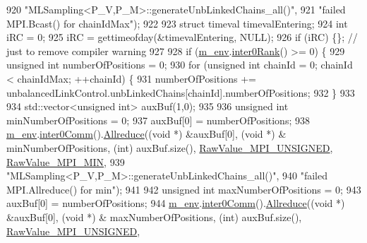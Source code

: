 \begin{DoxyCode}
920                         \textcolor{stringliteral}{"MLSampling<P\_V,P\_M>::generateUnbLinkedChains\_all()"},
921                         \textcolor{stringliteral}{"failed MPI.Bcast() for chainIdMax"});
922 
923   \textcolor{keyword}{struct }timeval timevalEntering;
924   \textcolor{keywordtype}{int} iRC = 0;
925   iRC = gettimeofday(&timevalEntering, NULL);
926   \textcolor{keywordflow}{if} (iRC) \{\}; \textcolor{comment}{// just to remove compiler warning}
927 
928   \textcolor{keywordflow}{if} (\hyperlink{class_q_u_e_s_o_1_1_m_l_sampling_a13f1ca4fe9f94822fe572a743eaced1d}{m\_env}.\hyperlink{class_q_u_e_s_o_1_1_base_environment_ae106b5bb8a80b655b88b3a26b1e7c185}{inter0Rank}() >= 0) \{
929     \textcolor{keywordtype}{unsigned} \textcolor{keywordtype}{int} numberOfPositions = 0;
930     \textcolor{keywordflow}{for} (\textcolor{keywordtype}{unsigned} \textcolor{keywordtype}{int} chainId = 0; chainId < chainIdMax; ++chainId) \{
931       numberOfPositions += unbalancedLinkControl.unbLinkedChains[chainId].numberOfPositions;
932     \}
933 
934     std::vector<unsigned int> auxBuf(1,0);
935 
936     \textcolor{keywordtype}{unsigned} \textcolor{keywordtype}{int} minNumberOfPositions = 0;
937     auxBuf[0] = numberOfPositions;
938     \hyperlink{class_q_u_e_s_o_1_1_m_l_sampling_a13f1ca4fe9f94822fe572a743eaced1d}{m\_env}.\hyperlink{class_q_u_e_s_o_1_1_base_environment_a689e4d140c74d495d97eb498714a4b82}{inter0Comm}().\hyperlink{class_q_u_e_s_o_1_1_mpi_comm_a72e137e60ef8060efb1ee5fc874fa4b8}{Allreduce}((\textcolor{keywordtype}{void} *) &auxBuf[0], (\textcolor{keywordtype}{void} *) &
      minNumberOfPositions, (\textcolor{keywordtype}{int}) auxBuf.size(), \hyperlink{_mpi_comm_8h_a06cbfbc33436f6e0dc8a48ff3c49bdfc}{RawValue\_MPI\_UNSIGNED}, 
      \hyperlink{_mpi_comm_8h_a8e30f42fdac116861205e83e2aa18042}{RawValue\_MPI\_MIN},
939                                  \textcolor{stringliteral}{"MLSampling<P\_V,P\_M>::generateUnbLinkedChains\_all()"},
940                                  \textcolor{stringliteral}{"failed MPI.Allreduce() for min"});
941 
942     \textcolor{keywordtype}{unsigned} \textcolor{keywordtype}{int} maxNumberOfPositions = 0;
943     auxBuf[0] = numberOfPositions;
944     \hyperlink{class_q_u_e_s_o_1_1_m_l_sampling_a13f1ca4fe9f94822fe572a743eaced1d}{m\_env}.\hyperlink{class_q_u_e_s_o_1_1_base_environment_a689e4d140c74d495d97eb498714a4b82}{inter0Comm}().\hyperlink{class_q_u_e_s_o_1_1_mpi_comm_a72e137e60ef8060efb1ee5fc874fa4b8}{Allreduce}((\textcolor{keywordtype}{void} *) &auxBuf[0], (\textcolor{keywordtype}{void} *) &
      maxNumberOfPositions, (\textcolor{keywordtype}{int}) auxBuf.size(), \hyperlink{_mpi_comm_8h_a06cbfbc33436f6e0dc8a48ff3c49bdfc}{RawValue\_MPI\_UNSIGNED}, 

\end{DoxyCode}
